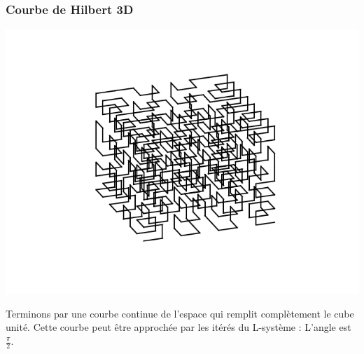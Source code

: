 \documentclass[11pt,class=report,crop=false]{standalone}
\begin{document}
\subsubsection*{Courbe de Hilbert 3D}


\begin{center}
\includegraphics[scale=\myscale,scale=0.6]{figures/hilbert-0}
\end{center}

Terminons par une courbe continue de l'espace qui remplit complètement le cube unité. Cette courbe peut être approchée par les itérés du L-système :
L'angle est $\frac\pi2$.
\end{document}
